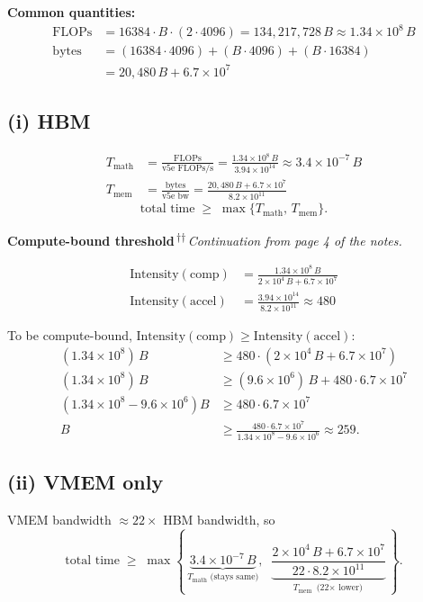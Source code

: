\documentclass[11pt]{article}
\newcommand{\flops}{\text{FLOPs}}
\newcommand{\flopss}{\text{FLOPs/s}}
\newcommand{\Tmath}{T_{\text{math}}}
\newcommand{\Tmem}{T_{\text{mem}}}
\begin{document}
\textbf{Common quantities:}
\begin{align*}
\flops &= 16384 \cdot B \cdot (2 \cdot 4096) = 134{,}217{,}728\, B \approx 1.34 \times 10^8\, B \\
\text{bytes} &= (16384 \cdot 4096) + (B \cdot 4096) + (B \cdot 16384) \\
             &= 20{,}480\, B + 6.7 \times 10^7
\end{align*}

\subsection*{(i) HBM}
\begin{align*}
\Tmath &= \frac{\flops}{\text{v5e } \flopss} = \frac{1.34 \times 10^8\, B}{3.94 \times 10^{14}} \approx 3.4 \times 10^{-7}\, B \\
\Tmem &= \frac{\text{bytes}}{\text{v5e bw}} = \frac{20{,}480\, B + 6.7 \times 10^7}{8.2 \times 10^{11}}
\end{align*}
\[
\text{total time} \;\geq\; \max\{\Tmath,\, \Tmem\}.
\]

\textbf{Compute-bound threshold}\,\textsuperscript{$\dagger$}\textsuperscript{$\dagger$}\,\emph{Continuation from page 4 of the notes.}

\begin{align*}
\text{Intensity}(\text{comp}) &= \frac{1.34 \times 10^8\, B}{2 \times 10^4\, B + 6.7 \times 10^7} \\
\text{Intensity}(\text{accel}) &= \frac{3.94 \times 10^{14}}{8.2 \times 10^{11}} \approx 480
\end{align*}

To be compute-bound, $\text{Intensity}(\text{comp}) \geq \text{Intensity}(\text{accel})$:
\begin{align*}
(1.34 \times 10^8)\, B &\geq 480 \cdot (2 \times 10^4\, B + 6.7 \times 10^7) \\
(1.34 \times 10^8)\, B &\geq (9.6 \times 10^6)\, B + 480 \cdot 6.7 \times 10^7 \\
\left(1.34 \times 10^8 - 9.6 \times 10^6\right) B &\geq 480 \cdot 6.7 \times 10^7 \\
B &\geq \frac{480 \cdot 6.7 \times 10^7}{1.34 \times 10^8 - 9.6 \times 10^6} \approx 259.
\end{align*}

\subsection*{(ii) VMEM only}
VMEM bandwidth $\approx 22 \times$ HBM bandwidth, so
\[
\text{total time} \;\geq\; \max\!\left\{\, \underbrace{3.4 \times 10^{-7}\, B}_{\Tmath\text{ (stays same)}},\;\;
\underbrace{\frac{2 \times 10^4\, B + 6.7 \times 10^7}{22 \cdot 8.2 \times 10^{11}}}_{\Tmem\text{ (22$\times$ lower)}} \,\right\}.
\]
\end{document}
